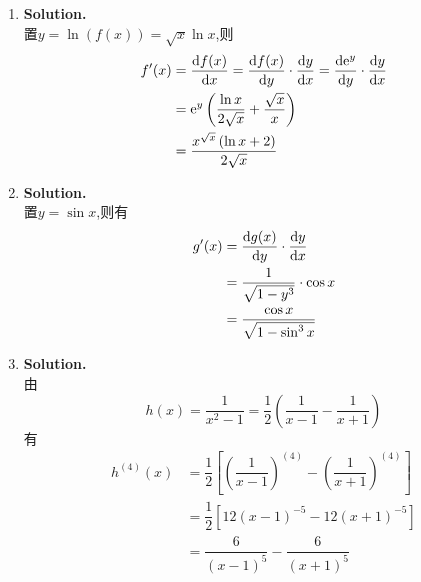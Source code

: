 \documentclass{ctexart}
\begin{document}
\begin{solution}[Solution.]
    \begin{enumerate}[label=\textbf{(\arabic*)},leftmargin=*]
        \item \textbf{Solution.}\\
            置$y=\ln(f(x))=\sqrt{x}\ln x$,则
            \begin{align*}
                f'(x)
                &= \dfrac{\mathrm{d} f(x)}{\mathrm{d} x}=\dfrac{\mathrm{d} f(x)}{\mathrm{d} y}\cdot\dfrac{\mathrm{d} y}{\mathrm{d} x}=\dfrac{\mathrm{d} \mathrm{e}^y}{\mathrm{d} y}\cdot\dfrac{\mathrm{d} y}{\mathrm{d} x} \\
                &= \mathrm{e}^y\left(\dfrac{\ln x}{2\sqrt{x}}+\dfrac{\sqrt{x}}{x}\right) \\
                &= \dfrac{x^{\sqrt{x}}\left(\ln x+2\right)}{2\sqrt{x}}
            \end{align*}
        \item \textbf{Solution.}\\
            置$y=\sin x$,则有
            \begin{align*}
                g'(x)
                &= \dfrac{\mathrm{d} g(x)}{\mathrm{d} y}\cdot\dfrac{\mathrm{d} y}{\mathrm{d} x} \\
                &= \dfrac{1}{\sqrt{1-y^3}}\cdot\cos x \\
                &= \dfrac{\cos x}{\sqrt{1-\sin^3 x}}
            \end{align*}
        \item \textbf{Solution.}\\
            由$$h(x)=\dfrac{1}{x^2-1}=\dfrac{1}{2}\left(\dfrac{1}{x-1}-\dfrac{1}{x+1}\right)$$
            有\begin{align*}
                h^{(4)}(x)
                &= \dfrac{1}{2}\left[\left(\dfrac{1}{x-1}\right)^{(4)}-\left(\dfrac{1}{x+1}\right)^{(4)}\right] \\
                &= \dfrac{1}{2}\left[12\left(x-1\right)^{-5}-12\left(x+1\right)^{-5}\right] \\
                &= \dfrac{6}{(x-1)^5}-\dfrac{6}{(x+1)^5}
            \end{align*}
    \end{enumerate}
\end{solution}
\begin{problem}
    
\end{problem}
\end{document}
